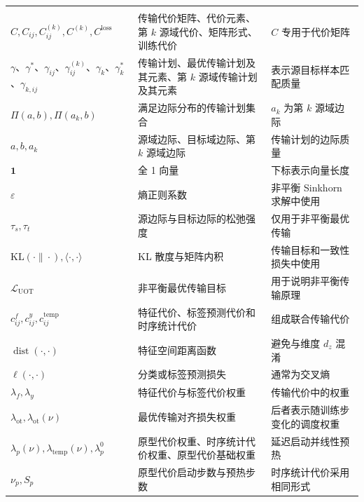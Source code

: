 \documentclass{seuthesis-2022}
\begin{document}
{\begin{longtable}{@{}>{\raggedright\arraybackslash}p{}>{\raggedright\arraybackslash}p{}>{\raggedright\arraybackslash}p{}@{}}
    \addlinespace
    \multicolumn{3}{l}{\textbf{最优传输与对齐}}\\
    \addlinespace
    $C,C_{ij},C_{ij}^{(k)},C^{(k)},C^{\mathrm{loss}}$ & 传输代价矩阵、代价元素、第 $k$ 源域代价、矩阵形式、训练代价 & $C$ 专用于代价矩阵 \\
    $\gamma$、$\gamma^\ast$、$\gamma_{ij}$、$\gamma_{ij}^{(k)}$、$\gamma_k$、$\gamma_k^\ast$、$\gamma_{k,ij}$ & 传输计划、最优传输计划及其元素、第 $k$ 源域传输计划及其元素 & 表示源目标样本匹配质量 \\
    $\Pi(a,b),\Pi(a_k,b)$ & 满足边际分布的传输计划集合 & $a_k$ 为第 $k$ 源域边际 \\
    $a,b,a_k$ & 源域边际、目标域边际、第 $k$ 源域边际 & 传输计划的边际质量 \\
    $\mathbf{1}$ & 全 1 向量 & 下标表示向量长度 \\
    $\varepsilon$ & 熵正则系数 & 非平衡 Sinkhorn 求解中使用 \\
    $\tau_s,\tau_t$ & 源边际与目标边际的松弛强度 & 仅用于非平衡最优传输 \\
    $\mathrm{KL}(\cdot\|\cdot),\langle\cdot,\cdot\rangle$ & KL 散度与矩阵内积 & 传输目标和一致性损失中使用 \\
    $\mathcal{L}_{\mathrm{UOT}}$ & 非平衡最优传输目标 & 用于说明非平衡传输原理 \\
    $c_{ij}^{f},c_{ij}^{y},c_{ij}^{\mathrm{temp}}$ & 特征代价、标签预测代价和时序统计代价 & 组成联合传输代价 \\
    $\operatorname{dist}(\cdot,\cdot)$ & 特征空间距离函数 & 避免与维度 $d_z$ 混淆 \\
    $\ell(\cdot,\cdot)$ & 分类或标签预测损失 & 通常为交叉熵 \\
    $\lambda_f,\lambda_y$ & 特征代价与标签代价权重 & 传输代价中的权重 \\
    $\lambda_{\mathrm{ot}},\lambda_{\mathrm{ot}}(\nu)$ & 最优传输对齐损失权重 & 后者表示随训练步变化的调度权重 \\
    $\lambda_p(\nu),\lambda_{\mathrm{temp}}(\nu),\lambda_p^0$ & 原型代价权重、时序统计代价权重、原型代价基础权重 & 延迟启动并线性预热 \\
    $\nu_p,S_p$ & 原型代价启动步数与预热步数 & 时序统计代价采用相同形式 \\


\end{longtable}}
\end{document}
